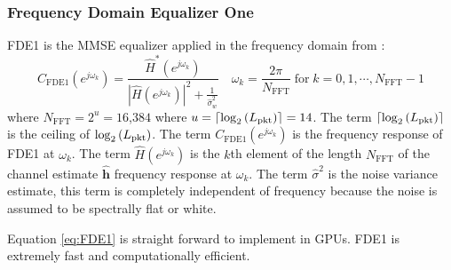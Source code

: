 \subsubsection{Frequency Domain Equalizer One}
FDE1 is the MMSE equalizer applied in the frequency domain from \cite[eq. (11)]{williams2013linear}:
\begin{equation}
C_\text{FDE1}(e^{j\omega_k}) = \frac{\hat{H}^\ast(e^{j\omega_k})}  {|\hat{H}(e^{j\omega_k})|^2  +  \frac{1}{\hat{\sigma}^2_w}} \quad
\omega_k = \frac{2\pi}{N_\text{FFT}} \;
\text{for} \;
k=0,1,\cdots,N_\text{FFT}-1
\label{eq:FDE1}
\end{equation}
where $N_\text{FFT} = 2^u = 16$,$384$ where $u = {\left\lceil \log_2{\left(L_\text{pkt}\right)}  \right\rceil} = 14$.
The term ${\left\lceil \log_2{\left(L_\text{pkt}\right)}  \right\rceil}$ is the ceiling of $\log_2{\left(L_\text{pkt}\right)}$.
The term $C_\text{FDE1}(e^{j\omega_k})$ is the frequency response of FDE1 at $\omega_k$.
The term $\hat{H}(e^{j\omega_k})$ is the $k$th element of the length $N_\text{FFT}$ of the channel estimate $\mathbf{\hat{h}}$ frequency response at $\omega_k$.
The term $\hat{\sigma}^2$ is the noise variance estimate, this term is completely independent of frequency because the noise is assumed to be spectrally flat or white.

Equation \eqref{eq:FDE1} is straight forward to implement in GPUs.
FDE1 is extremely fast and computationally efficient.

